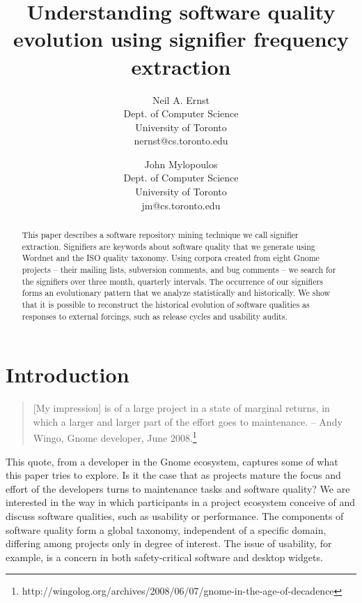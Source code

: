 \documentclass[conference, compsoc]{IEEEtran}
\begin{document}

 
\title{Understanding software quality evolution using signifier frequency extraction}
\author{
Neil A. Ernst\\Dept. of Computer Science\\University of Toronto\\nernst@cs.toronto.edu \and
John Mylopoulos\\Dept. of Computer Science\\University of Toronto\\jm@cs.toronto.edu }

\maketitle

\begin{abstract}
This paper describes a software repository mining technique we call signifier extraction. Signifiers are keywords about software quality that we generate using Wordnet and the ISO quality taxonomy. Using corpora created from eight Gnome projects -- their mailing lists, subversion comments, and bug comments -- we search for the signifiers over three month, quarterly intervals. The occurrence of our signifiers forms an evolutionary pattern that we analyze statistically and historically. We show that it is possible to reconstruct the historical evolution of software qualities as responses to external forcings, such as release cycles and usability audits. %
\end{abstract}
\vspace{-2mm}
\section{Introduction}\label{sect:introduction}%
\vspace{-2mm}
\begin{quote}[My impression] is of a large project in a state of marginal returns, in which a larger and larger part of the effort goes to maintenance. -- Andy Wingo, Gnome developer, June 2008.\footnote{http://wingolog.org/archives/2008/06/07/gnome-in-the-age-of-decadence}\end{quote}
	This quote, from a developer in the Gnome ecosystem, captures some of what this paper tries to explore. Is it the case that as projects mature the focus and effort of the developers turns to maintenance tasks and software quality? 
We are interested in the way in which participants in a project ecosystem conceive of and discuss software qualities, such as usability or performance. The components of software quality form a global taxonomy, independent of a specific domain, differing among projects only in degree of interest. The issue of usability, for example, is a concern in both safety-critical software and desktop widgets. 
\end{document}
